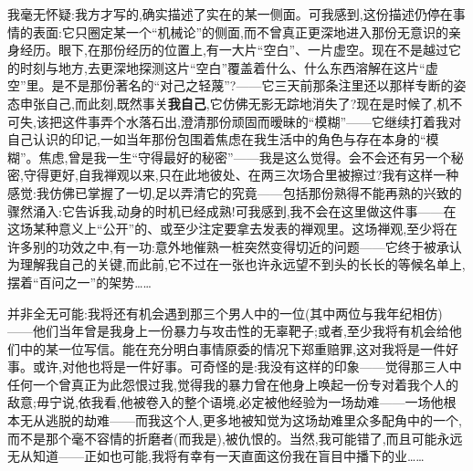 \dmark{}我毫无怀疑:我方才写的,确实描述了实在的某一侧面。可我感到,这份描述仍停在事情的表面:它只圈定某一个“机械论”的侧面,而不曾真正更深地进入那份无意识的亲身经历。眼下,在那份经历的位置上,有一大片“空白”、一片虚空。现在不是越过它的时刻与地方,去更深地探测这片“空白”覆盖着什么、什么东西溶解在这片“虚空”里。是不是那份著名的“对己之轻蔑”?——它三天前那条注里还以那样专断的姿态申张自己,而此刻,既然事关\textbf{我自己},它仿佛无影无踪地消失了?现在是时候了,机不可失,该把这件事弄个水落石出,澄清那份顽固而暧昧的“模糊”——它继续打着我对自己认识的印记,一如当年那份包围着焦虑在我生活中的角色与存在本身的“模糊”。焦虑,曾是我一生“守得最好的秘密”——我是这么觉得。会不会还有另一个秘密,守得更好,自我禅观以来,只在此地彼处、在两三次场合里被擦过?我有这样一种感觉:我仿佛已掌握了一切,足以弄清它的究竟——包括那份熟得不能再熟的兴致的骤然涌入:它告诉我,动身的时机已经成熟!可我感到,我不会在这里做这件事——在这场某种意义上“公开”的、或至少注定要拿去发表的禅观里。这场禅观,至少将在许多别的功效之中,有一功:意外地催熟一桩突然变得切近的问题——它终于被承认为理解我自己的关键,而此前,它不过在一张也许永远望不到头的长长的等候名单上,摆着“百问之一”的架势……

并非全无可能:我将还有机会遇到那三个男人中的一位(其中两位与我年纪相仿)——他们当年曾是我身上一份暴力与攻击性的无辜靶子;或者,至少我将有机会给他们中的某一位写信。能在充分明白事情原委的情况下郑重赔罪,这对我将是一件好事。或许,对他也将是一件好事。可奇怪的是:我没有这样的印象——觉得那三人中任何一个曾真正为此怨恨过我,觉得我的暴力曾在他身上唤起一份专对着我个人的敌意;毋宁说,依我看,他被卷入的整个语境,必定被他经验为一场劫难——一场他根本无从逃脱的劫难——而我这个人,更多地被知觉为这场劫难里众多配角中的一个,而不是那个毫不容情的折磨者\dmark{}(而我是),被仇恨的。当然,我可能错了,而且可能永远无从知道——正如也可能,我将有幸有一天直面这份我在盲目中播下的业……

